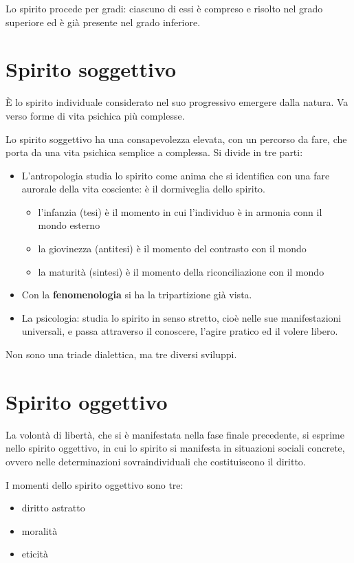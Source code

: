 \documentclass[a4paper, twoside, titlepage]{book}
\begin{document}
Lo spirito procede per gradi: ciascuno di essi è compreso e risolto nel grado superiore ed è già presente nel grado inferiore.

\section{Spirito soggettivo}

È lo spirito individuale considerato nel suo progressivo emergere dalla natura. Va verso forme di vita psichica più complesse.

Lo spirito soggettivo ha una consapevolezza elevata, con un percorso da fare, che porta da una vita psichica semplice a complessa. Si divide in tre parti:
\begin{itemize}
\item L'\textit{}antropologia\textit{} studia lo spirito come anima che si identifica con una fare aurorale della vita cosciente: è il dormiveglia dello spirito.
\begin{itemize}
  \item l'infanzia (tesi) è il momento in cui l'individuo è in armonia conn il mondo esterno
  \item la giovinezza (antitesi) è il momento del contrasto con il mondo
  \item la maturità (sintesi) è il momento della riconciliazione con il mondo
  \end{itemize}
\item Con la \textbf{fenomenologia} si ha la tripartizione già vista.
\item La \textit{}psicologia\textit{}: studia lo spirito in senso stretto, cioè nelle sue manifestazioni universali, e passa attraverso il conoscere, l'agire pratico ed il volere libero.
\end{itemize}

Non sono una triade dialettica, ma tre diversi sviluppi.

\section{Spirito oggettivo}

La volontà di libertà, che si è manifestata nella fase finale precedente, si esprime nello spirito oggettivo, in cui lo spirito si manifesta in situazioni sociali concrete, ovvero nelle determinazioni sovraindividuali che costituiscono il diritto.

I momenti dello spirito oggettivo sono tre:
\begin{itemize}
\item diritto astratto
\item moralità
\item eticità
\end{itemize}
\end{document}
